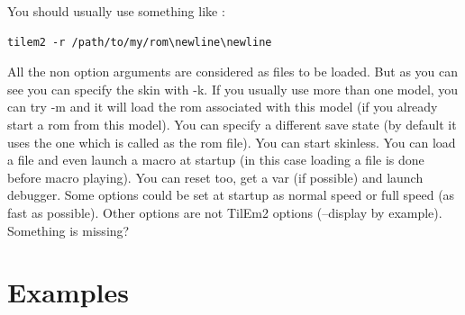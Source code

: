 \documentclass[10pt]{report}
\begin{document}
You should usually use something like : \newline

\begin{lstlisting}
tilem2 -r /path/to/my/rom\newline\newline
\end{lstlisting}

All the non option arguments are considered as files to be loaded.\newline
But as you can see you can specify the skin with -k.\newline
If you usually use more than one model, you can try -m and it will load the rom associated with this model (if you already start a rom from this model).\newline
You can specify a different save state (by default it uses the one which is called as the rom file).\newline
You can start skinless.\newline
You can load a file and even launch a macro at startup (in this case loading a file is done before macro playing).\newline
You can reset too, get a var (if possible) and launch debugger.\newline
Some options could be set at startup as normal speed or full speed (as fast as possible).\newline
Other options are not TilEm2 options (--display by example).\newline
Something is missing?\newline

\section{Examples}
\end{document}
